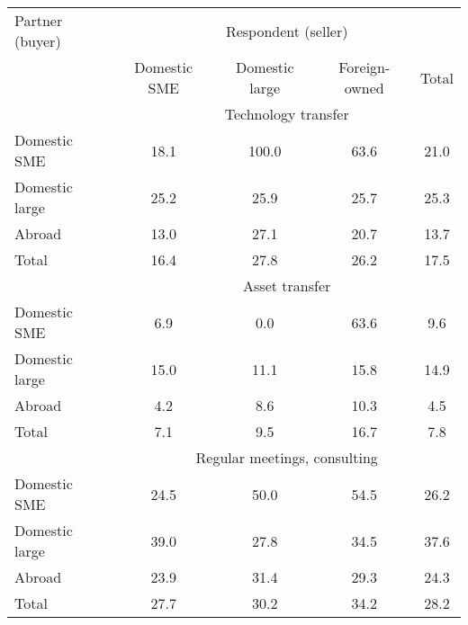 
\begin{tabular}{lcccc} \hline
Partner (buyer)	&\multicolumn{4}{c}{Respondent (seller)}	\\		
	&Domestic SME	&Domestic large	&Foreign-owned	&Total \\
	\hline
	\hline
&\multicolumn{4}{c}{Technology transfer}\\
Domestic SME	&18.1	&100.0	&63.6	&21.0 \\
Domestic large	&25.2	&25.9	&25.7	&25.3 \\
Abroad	&13.0	&27.1	&20.7	&13.7\\
Total	&16.4	&27.8	&26.2	&17.5\\
\hline	
	
&\multicolumn{4}{c}{Asset transfer}\\
Domestic SME&	6.9&	0.0&	63.6&	9.6\\
Domestic large&	15.0&	11.1&	15.8&	14.9\\
Abroad&	4.2&	8.6&	10.3&	4.5\\
Total&	7.1&	9.5&	16.7&	7.8\\
\hline
&\multicolumn{4}{c}{Regular meetings, consulting}\\
Domestic SME&	24.5&	50.0&	54.5&	26.2\\
Domestic large&	39.0&	27.8&	34.5&	37.6\\
Abroad&	23.9&	31.4&	29.3&	24.3\\
Total&	27.7&	30.2&	34.2&	28.2\\
\hline
\end{tabular}

